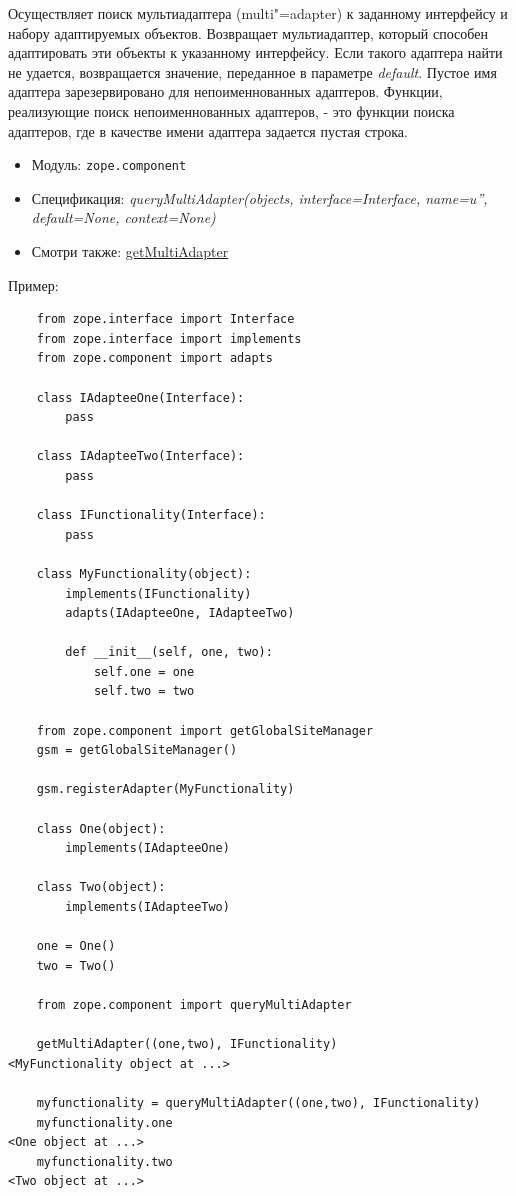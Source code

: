 \documentclass[a4paper,openany,twoside,draft]{book}
\providecommand*{\DUroletitlereference}[1]{\textsl{#1}}
\begin{document}
Осуществляет поиск мультиадаптера (multi"=adapter) к заданному интерфейсу и набору адаптируемых объектов.  Возвращает мультиадаптер, который способен адаптировать эти объекты к указанному интерфейсу.  Если такого адаптера найти не удается, возвращается значение, переданное в параметре \DUroletitlereference{default}.  Пустое имя адаптера зарезервировано для непоименнованных адаптеров.  Функции, реализующие поиск непоименнованных адаптеров, - это функции поиска адаптеров, где в качестве имени адаптера задается пустая строка.

\begin{itemize}

\item Модуль: \texttt{zope.component}

\item Спецификация: \DUroletitlereference{queryMultiAdapter(objects, interface=Interface, name=u'', default=None, context=None)}

\item Смотри также: \hyperref[getmultiadapter]{getMultiAdapter}

\end{itemize}

Пример:

\begin{verbatim}
    from zope.interface import Interface
    from zope.interface import implements
    from zope.component import adapts

    class IAdapteeOne(Interface):
        pass

    class IAdapteeTwo(Interface):
        pass

    class IFunctionality(Interface):
        pass

    class MyFunctionality(object):
        implements(IFunctionality)
        adapts(IAdapteeOne, IAdapteeTwo)

        def __init__(self, one, two):
            self.one = one
            self.two = two

    from zope.component import getGlobalSiteManager
    gsm = getGlobalSiteManager()

    gsm.registerAdapter(MyFunctionality)

    class One(object):
        implements(IAdapteeOne)

    class Two(object):
        implements(IAdapteeTwo)

    one = One()
    two = Two()

    from zope.component import queryMultiAdapter

    getMultiAdapter((one,two), IFunctionality)
<MyFunctionality object at ...>

    myfunctionality = queryMultiAdapter((one,two), IFunctionality)
    myfunctionality.one
<One object at ...>
    myfunctionality.two
<Two object at ...>
\end{verbatim}
\end{document}
